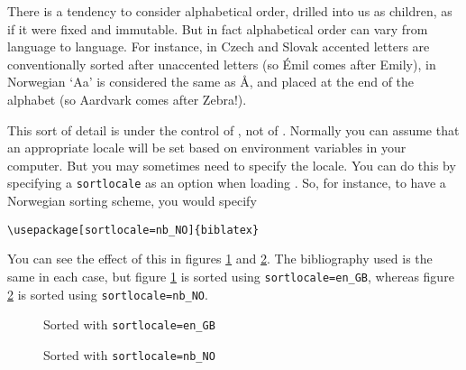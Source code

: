 There is a tendency to consider alphabetical order, drilled into us as children, as if it were fixed and immutable. But in fact alphabetical order can vary from language to language. For instance, in Czech and Slovak accented letters are conventionally sorted after unaccented letters (so \'{E}mil comes after Emily), in Norwegian `Aa' is considered the same as \r{A}, and placed at the end of the alphabet (so Aardvark comes after Zebra!).

This sort of detail is under the control of , not of \biblatex. Normally you can assume that an appropriate locale will be set based on environment variables in your computer. But you may sometimes need to specify the locale. You can do this by specifying a \texttt{sortlocale} as an option when loading \biblatex. So, for instance, to have a Norwegian sorting scheme, you would specify
\begin{verbatim}
\usepackage[sortlocale=nb_NO]{biblatex}
\end{verbatim}

You can see the effect of this in figures \ref{zebra:en} and \ref{zebra:no}. The bibliography used is the same in each case, but figure \ref{zebra:en} is sorted using \texttt{sortlocale=en\_GB}, whereas figure \ref{zebra:no} is sorted using \texttt{sortlocale=nb\_NO}.

\begin{figure}
\caption{Sorted with \texttt{sortlocale=en\_GB}\label{zebra:en}}
\end{figure}

\begin{figure}
\caption{Sorted with \texttt{sortlocale=nb\_NO}\label{zebra:no}}
\end{figure}
